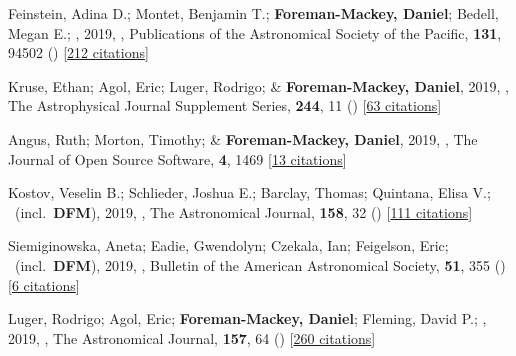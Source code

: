 \item[{\color{numcolor}\scriptsize47}] Feinstein, Adina D.; Montet, Benjamin T.; \textbf{Foreman-Mackey, Daniel}; Bedell, Megan E.; \etal, 2019, , Publications of the Astronomical Society of the Pacific, \textbf{131}, 94502 () [\href{https://ui.adsabs.harvard.edu/abs/2019PASP..131i4502F}{212 citations}]

\item[{\color{numcolor}\scriptsize46}] Kruse, Ethan; Agol, Eric; Luger, Rodrigo; \& \textbf{Foreman-Mackey, Daniel}, 2019, , The Astrophysical Journal Supplement Series, \textbf{244}, 11 () [\href{https://ui.adsabs.harvard.edu/abs/2019ApJS..244...11K}{63 citations}]

\item[{\color{numcolor}\scriptsize45}] Angus, Ruth; Morton, Timothy; \& \textbf{Foreman-Mackey, Daniel}, 2019, , The Journal of Open Source Software, \textbf{4}, 1469 [\href{https://ui.adsabs.harvard.edu/abs/2019JOSS....4.1469A}{13 citations}]

\item[{\color{numcolor}\scriptsize44}] Kostov, Veselin B.; Schlieder, Joshua E.; Barclay, Thomas; Quintana, Elisa V.; \etal\ (incl.\ \textbf{DFM}), 2019, , The Astronomical Journal, \textbf{158}, 32 () [\href{https://ui.adsabs.harvard.edu/abs/2019AJ....158...32K}{111 citations}]

\item[{\color{numcolor}\scriptsize43}] Siemiginowska, Aneta; Eadie, Gwendolyn; Czekala, Ian; Feigelson, Eric; \etal\ (incl.\ \textbf{DFM}), 2019, , Bulletin of the American Astronomical Society, \textbf{51}, 355 () [\href{https://ui.adsabs.harvard.edu/abs/2019BAAS...51c.355S}{6 citations}]

\item[{\color{numcolor}\scriptsize42}] Luger, Rodrigo; Agol, Eric; \textbf{Foreman-Mackey, Daniel}; Fleming, David P.; \etal, 2019, , The Astronomical Journal, \textbf{157}, 64 () [\href{https://ui.adsabs.harvard.edu/abs/2019AJ....157...64L}{260 citations}]

